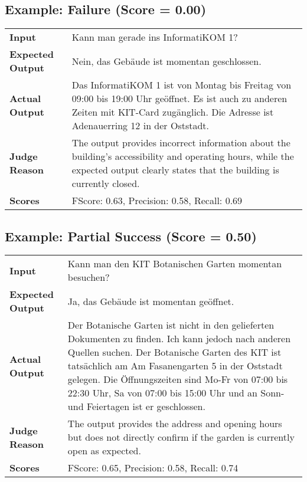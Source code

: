 \documentclass{article}
\begin{document}
\subsection*{Example: Failure (Score = 0.00)}
\begin{longtable}{p{} p{}}
\textbf{Input} & Kann man gerade ins InformatiKOM 1? \\
\textbf{Expected Output} & Nein, das Gebäude ist momentan geschlossen. \\
\textbf{Actual Output} & Das InformatiKOM 1 ist von Montag bis Freitag von 09:00 bis 19:00 Uhr geöffnet. Es ist auch zu anderen Zeiten mit KIT-Card zugänglich. Die Adresse ist Adenauerring 12 in der Oststadt. \\
\textbf{Judge Reason} & The output provides incorrect information about the building's accessibility and operating hours, while the expected output clearly states that the building is currently closed. \\
\textbf{Scores} & FScore: 0.63, Precision: 0.58, Recall: 0.69 \\
\end{longtable}
\subsection*{Example: Partial Success (Score = 0.50)}
\begin{longtable}{p{} p{}}
\textbf{Input} & Kann man den KIT Botanischen Garten momentan besuchen? \\
\textbf{Expected Output} & Ja, das Gebäude ist momentan geöffnet. \\
\textbf{Actual Output} & Der Botanische Garten ist nicht in den gelieferten Dokumenten zu finden. Ich kann jedoch nach anderen Quellen suchen. Der Botanische Garten des KIT ist tatsächlich am Am Fasanengarten 5 in der Oststadt gelegen. Die Öffnungszeiten sind Mo-Fr von 07:00 bis 22:30 Uhr, Sa von 07:00 bis 15:00 Uhr und an Sonn- und Feiertagen ist er geschlossen. \\
\textbf{Judge Reason} & The output provides the address and opening hours but does not directly confirm if the garden is currently open as expected. \\
\textbf{Scores} & FScore: 0.65, Precision: 0.58, Recall: 0.74 \\
\end{longtable}
\end{document}
